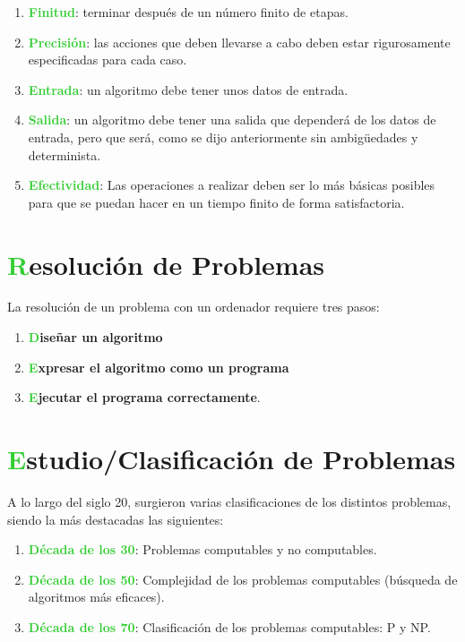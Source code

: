 \documentclass[10pt,a4paper,spanish]{report}
\theoremstyle{definition}
\theoremstyle{remark}
\begin{document}
    \begin{enumerate}[$ \clubsuit $]
        \item \textbf{\textcolor{LimeGreen}{Finitud}}: terminar después de un número finito de etapas.
        \item \textbf{\textcolor{LimeGreen}{Precisión}}: las acciones que deben llevarse a cabo deben estar rigurosamente especificadas para cada caso.
        \item \textbf{\textcolor{LimeGreen}{Entrada}}: un algoritmo debe tener unos datos de entrada.
        \item \textbf{\textcolor{LimeGreen}{Salida}}: un algoritmo debe tener una salida que dependerá de los datos de entrada, pero que será, como se dijo anteriormente sin ambigüedades y determinista.
        \item \textbf{\textcolor{LimeGreen}{Efectividad}}: Las operaciones a realizar deben ser lo más básicas posibles para que se puedan hacer en un tiempo finito de forma satisfactoria.
    \end{enumerate}

    \section{\textcolor{LimeGreen}Resolución de Problemas}

    
    La resolución de un problema con un ordenador requiere tres pasos:

    \begin{enumerate}[$ \clubsuit $]
        \item \textbf{\textcolor{LimeGreen}Diseñar un algoritmo}
        \item \textbf{\textcolor{LimeGreen}Expresar el algoritmo como un programa}
        \item \textbf{\textcolor{LimeGreen}Ejecutar el programa correctamente}.
    \end{enumerate}

    \section{\textcolor{LimeGreen}Estudio/Clasificación de Problemas}

    
    A lo largo del siglo 20, surgieron varias clasificaciones de los distintos problemas, siendo la más destacadas las siguientes:

    \begin{enumerate}[$ \clubsuit $]
        \item \textbf{\textcolor{LimeGreen}{Década de los 30}}: Problemas computables y no computables.
        \item \textbf{\textcolor{LimeGreen}{Década de los 50}}: Complejidad de los problemas computables (búsqueda de algoritmos más eficaces).
        \item \textbf{\textcolor{LimeGreen}{Década de los 70}}: Clasificación de los problemas computables: P y NP.
    \end{enumerate}
\end{document}
